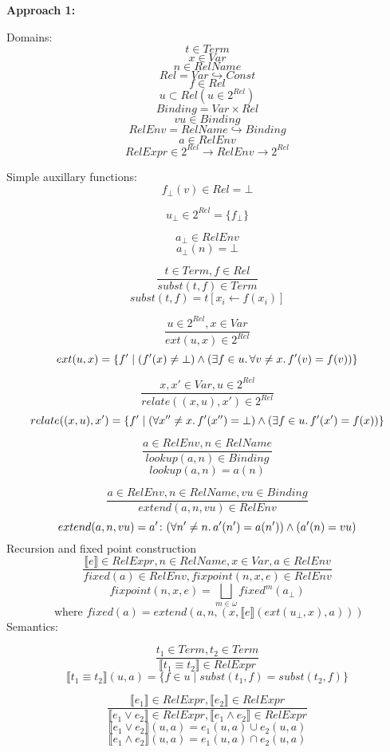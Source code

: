 \documentclass[11pt]{article}
\begin{document}
\begin{center}
\textbf {Approach 1:}
\end{center}
\newcommand{\keyword}[1]{\textrm{\textbf{#1}}}
\newcommand{\semantics}[1]{\llbracket#1\rrbracket}
Domains:
$$ t \in Term $$
$$ x \in Var $$
$$ n \in RelName $$
$$ Rel = Var \hookrightarrow Const $$
$$ f \in Rel $$
$$ u \subset Rel (u \in 2^{Rel}) $$
$$ Binding = Var \times Rel $$
$$ vu \in Binding $$
$$ RelEnv = RelName \hookrightarrow Binding $$
$$ a \in RelEnv $$
$$ RelExpr \in 2^{Rel} \rightarrow RelEnv \rightarrow 2^{Rel} $$

\newpage
Simple auxillary functions:
$$ f_\bot(v) \in Rel = \bot $$

$$ u_\bot \in 2^{Rel} = \{f_\bot\} $$

$$ a_\bot \in RelEnv $$
$$ a_\bot(n) = \bot $$

$$\frac{t \in Term, f \in Rel}{ subst(t,f) \in Term } $$
$$ subst(t,f) = t[x_i \leftarrow f(x_i)] $$

$$ \frac{ u \in 2^{Rel} , x \in Var}{ ext(u,x) \in 2^{Rel} } $$
$$ ext(u,x) = \{ f' \mid (f'(x) \neq \bot) \wedge (\exists f \in u \ldotp \forall v \neq x \ldotp f'(v) = f(v)) \} $$

$$ \frac{ x,x' \in Var, u \in 2^{Rel} }{relate((x,u), x') \in 2^{Rel} } $$
$$ relate((x,u), x') = \{ f' \mid (\forall x'' \neq x \ldotp f'(x'') = \bot) \wedge (\exists f \in u \ldotp f'(x') = f(x)) \} $$

$$ \frac{ a \in RelEnv, n \in RelName }{ lookup(a,n) \in Binding } $$
$$ lookup(a,n) = a(n) $$

$$ \frac{ a \in RelEnv, n \in RelName, vu \in Binding }{ extend(a,n,vu) \in RelEnv } $$
$$ extend(a,n,vu) = a' \colon (\forall n' \neq n \ldotp a'(n') = a(n')) \wedge (a'(n) = vu) $$
\newpage
Recursion and fixed point construction
$$ \frac{\semantics{e} \in RelExpr, n \in RelName, x \in Var, a \in RelEnv }
{fixed(a) \in RelEnv, fixpoint(n,x,e) \in RelEnv } $$
$$ fixpoint(n, x, e) = \bigsqcup_{m \in \omega} fixed^m(a_\bot) $$
$$ \textrm{ where } fixed(a) = extend(a, n, (x, \semantics{e}(ext(u_\bot, x),a))) $$
\newpage
Semantics:

$$ \frac{t_1 \in Term , t_2 \in Term}{\semantics{t_1 \equiv t_2} \in RelExpr} $$
$$ \semantics{t_1 \equiv t_2}(u, a) = \{ f \in u  \mid subst(t_1, f) = subst(t_2, f) \} $$

$$ \frac{\semantics{e_1} \in RelExpr,  \semantics{e_2} \in RelExpr}{\semantics{e_1 \vee e_2} \in RelExpr, \semantics{e_1 \wedge e_2} \in RelExpr}$$
$$ \semantics{e_1 \vee e_2} (u, a) = e_1(u, a) \cup e_2(u, a) $$
$$ \semantics{e_1 \wedge e_2}(u, a) = e_1(u, a) \cap e_2(u, a) $$
\end{document}
